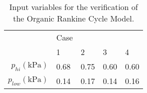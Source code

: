 \begin{table}%
	\centering
	\caption{Input variables for the verification of the Organic Rankine Cycle Model.}
	\label{tab:verification_ORC_vars02}
	\begin{tabular}{rllll}
		\toprule
		                                              &  Case &       &       &       \\ \cline{2-5}
		                                              &     1 &     2 &     3 &     4 \\ \midrule

		$p_{hi}(\si{\kilo\pascal})  $                 &  0.68 &  0.75 &  0.60 &  0.60 \\
		$p_{low}(\si{\kilo\pascal}) $                 &  0.14 &  0.17 &  0.14 &  0.16 \\
		\bottomrule
	\end{tabular}
\end{table}

